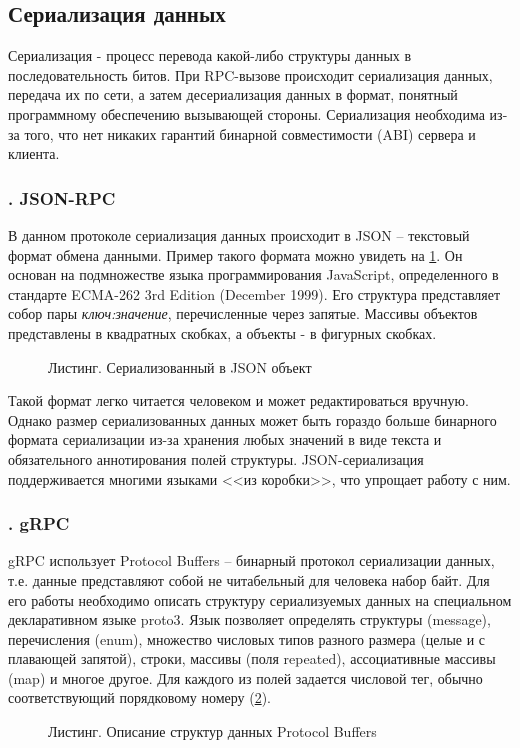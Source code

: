 \documentclass[a4paper,14pt,indentfirst]{extreport}
\newcommand{\EN}[1]{\foreignlanguage{english}{#1}}
\begin{document}
\subsection{Сериализация данных}
Сериализация - процесс перевода какой-либо структуры данных в последовательность битов. При RPC-вызове происходит сериализация данных, передача их по сети, а затем десериализация данных в формат, понятный программному обеспечению вызывающей стороны. Сериализация необходима из-за того, что нет никаких гарантий бинарной совместимости (ABI) сервера и клиента.
\subsubsection*{\thesubsubsection. JSON-RPC}
В данном протоколе сериализация данных происходит в JSON -- текстовый формат обмена данными. Пример такого формата можно увидеть на \cref{json}. Он основан на подмножестве языка программирования JavaScript, определенного в стандарте \EN{ECMA-262 3rd Edition (December 1999)}. Его структура представляет собор пары \textit{ключ:значение}, перечисленные через запятые. Массивы объектов представлены в квадратных скобках, а объекты - в фигурных скобках.

\begin{figure}[H]
  
  \caption{Листинг. Сериализованный в JSON объект}
  \label{json}
\end{figure}

Такой формат легко читается человеком и может редактироваться вручную. Однако размер сериализованных данных может быть гораздо больше бинарного формата сериализации из-за хранения любых значений в виде текста и обязательного аннотирования полей структуры. JSON-сериализация поддерживается многими языками <<из коробки>>, что упрощает работу с ним.
\subsubsection*{\thesubsubsection. gRPC}
gRPC использует Protocol Buffers -- бинарный протокол сериализации данных, т.е. данные представляют собой не читабельный для человека набор байт. Для его работы необходимо описать структуру сериализуемых данных на специальном декларативном языке proto3. Язык позволяет определять структуры (message), перечисления (enum), множество числовых типов разного размера (целые и с плавающей запятой), строки, массивы (поля repeated), ассоциативные массивы (map) и многое другое. Для каждого из полей задается числовой тег, обычно соответствующий порядковому номеру (\cref{grpc}).
\FloatBarrier
\begin{figure}[h]
  
  \caption{Листинг. Описание структур данных Protocol Buffers}
  \label{grpc}
\end{figure}
\end{document}
